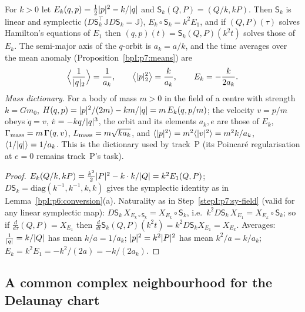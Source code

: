 \begin{proposition}\label{bpI:p7:scaling}
For $k>0$ let $E_k(q,p)=\tfrac12\lvert p\rvert^2-k/\lvert q\rvert$ and $\mathsf S_k(Q,P)=(Q/k,kP)$. Then $\mathsf S_k$ is linear and symplectic ($D\mathsf S_k^\top\mathbb JD\mathsf S_k=\mathbb J$), $E_k\circ\mathsf S_k=k^2E_1$, and if $(Q,P)(\tau)$ solves Hamilton's equations of $E_1$ then $(q,p)(t)=\mathsf S_k(Q,P)(k^2t)$ solves those of $E_k$. The semi-major axis of the $q$-orbit is $a_k=a/k$, and the time averages over the mean anomaly (Proposition~\ref{bpI:p7:means}) are
\[
\Bigl\langle\frac1{\lvert q\rvert_2}\Bigr\rangle=\frac1{a_k},\qquad\bigl\langle\lvert p\rvert_2^2\bigr\rangle=\frac k{a_k},\qquad E_k=-\frac k{2a_k}.
\]
\emph{Mass dictionary.} For a body of mass $m>0$ in the field of a centre with strength $k=Gm_0$, $H(q,p)=\lvert p\rvert^2/(2m)-km/\lvert q\rvert=m\,E_k(q,p/m)$; the velocity $v=p/m$ obeys $\dot q=v$, $\dot v=-kq/\lvert q\rvert^3$, the orbit and its elements $a_k,e$ are those of $E_k$, $\Gamma_{\rm mass}=m\,\Gamma(q,v)$, $L_{\rm mass}=m\sqrt{ka_k}$, and $\langle\lvert p\rvert^2\rangle=m^2\langle\lvert v\rvert^2\rangle=m^2k/a_k$, $\langle1/\lvert q\rvert\rangle=1/a_k$. This is the dictionary used by track~P (its Poincar\'e regularisation at $e=0$ remains track~P's task).
\end{proposition}
\begin{proof}
\label{stepI:p7:sc-alg} $E_k(Q/k,kP)=\tfrac{k^2}2\lvert P\rvert^2-k\cdot k/\lvert Q\rvert=k^2E_1(Q,P)$; $D\mathsf S_k=\mathrm{diag}(k^{-1},k^{-1},k,k)$ gives the symplectic identity as in Lemma~\ref{bpI:p6:conversion}(a).
\label{stepI:p7:sc-flow} Naturality as in Step~\ref{stepI:p7:sy-field} (valid for any linear symplectic map): $D\mathsf S_k\,X_{E_k\circ\mathsf S_k}=X_{E_k}\circ\mathsf S_k$, i.e.\ $k^2D\mathsf S_k\,X_{E_1}=X_{E_k}\circ\mathsf S_k$; so if $\frac d{d\tau}(Q,P)=X_{E_1}$ then $\frac d{dt}\mathsf S_k(Q,P)(k^2t)=k^2D\mathsf S_kX_{E_1}=X_{E_k}$. Averages: $\tfrac1{\lvert q\rvert}=k/\lvert Q\rvert$ has mean $k/a=1/a_k$; $\lvert p\rvert^2=k^2\lvert P\rvert^2$ has mean $k^2/a=k/a_k$; $E_k=k^2E_1=-k^2/(2a)=-k/(2a_k)$.
\end{proof}

\subsection{A common complex neighbourhood for the Delaunay chart}\label{bpI:p7:sec-complex}

